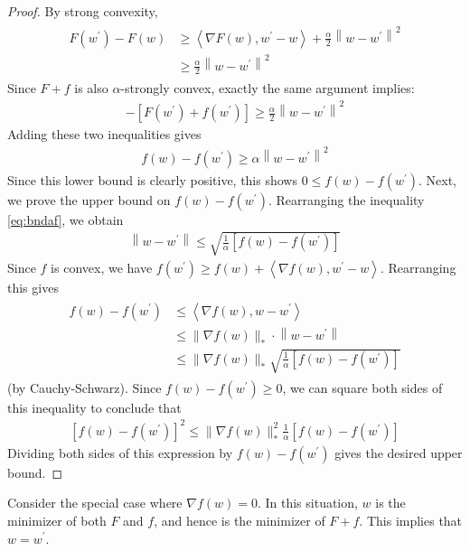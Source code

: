 \documentclass{article}
\begin{document}
\begin{proof}\color{ForestGreen}
  By strong convexity,
\begin{align*}
\begin{aligned}
F\left(w^{\prime}\right)-F(w) & \geq\left\langle\nabla F(w), w^{\prime}-w\right\rangle+\frac{\alpha}{2}\left\|w-w^{\prime}\right\|^{2} \\
& \geq \frac{\alpha}{2}\left\|w-w^{\prime}\right\|^{2}
\end{aligned}
\end{align*}
Since $F+f$ is also $\alpha$-strongly convex, exactly the same argument implies:
\begin{align*}
[F(w)+f(w)]-\left[F\left(w^{\prime}\right)+f\left(w^{\prime}\right)\right] \geq \frac{\alpha}{2}\left\|w-w^{\prime}\right\|^{2}
\end{align*}
Adding these two inequalities gives
\begin{align}
f(w)-f\left(w^{\prime}\right) \geq \alpha\left\|w-w^{\prime}\right\|^{2}\label{eq:bndaf}
\end{align}
Since this lower bound is clearly positive, this shows $0 \leq f(w)-f\left(w^{\prime}\right)$.
Next, we prove the upper bound on $f(w)-f\left(w^{\prime}\right)$. Rearranging the inequality \cref{eq:bndaf}, we obtain
\begin{align*}
\left\|w-w^{\prime}\right\| \leq \sqrt{\frac{1}{\alpha}\left[f(w)-f\left(w^{\prime}\right)\right]}
\end{align*}
Since $f$ is convex, we have $f\left(w^{\prime}\right) \geq f(w)+\left\langle\nabla f(w), w^{\prime}-w\right\rangle$. Rearranging this gives
\begin{align*}
\begin{aligned}
f(w)-f\left(w^{\prime}\right) & \leq\left\langle\nabla f(w), w-w^{\prime}\right\rangle \\
& \leq\|\nabla f(w)\|_{*} \cdot\left\|w-w^{\prime}\right\| \\
& \leq\|\nabla f(w)\|_{*} \sqrt{\frac{1}{\alpha}\left[f(w)-f\left(w^{\prime}\right)\right]}
\end{aligned}
\end{align*}
(by Cauchy-Schwarz).
Since $f(w)-f\left(w^{\prime}\right) \geq 0$, we can square both sides of this inequality to conclude that
\begin{align*}
\left[f(w)-f\left(w^{\prime}\right)\right]^{2} \leq\|\nabla f(w)\|_{*}^{2} \frac{1}{\alpha}\left[f(w)-f\left(w^{\prime}\right)\right]
\end{align*}
Dividing both sides of this expression by $f(w)-f\left(w^{\prime}\right)$ gives the desired upper bound.
\end{proof}
\begin{rema}
 Consider the special case where $\nabla f(w)=0$. In this situation, $w$ is the minimizer of both $F$ and $f$, and hence is the minimizer of $F+f$. This implies that $w=w^{\prime}$.
\end{rema}
\end{document}
